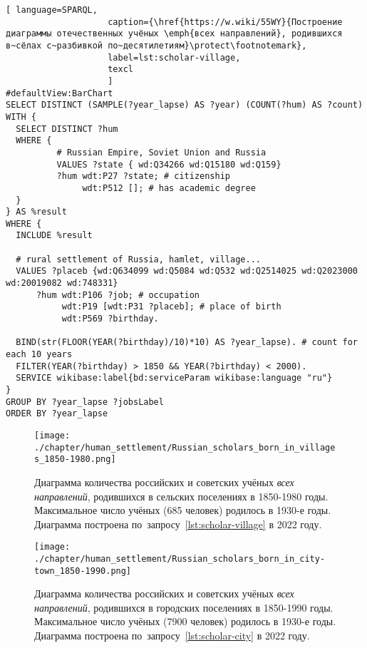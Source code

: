 \begin{fullwidth}
\begin{lstlisting}[ language=SPARQL, 
                    caption={\href{https://w.wiki/55WY}{Построение диаграммы отечественных учёных \emph{всех направлений}, родившихся в~сёлах с~разбивкой по~десятилетиям}\protect\footnotemark},
                    label=lst:scholar-village,
                    texcl 
                    ]
#defaultView:BarChart
SELECT DISTINCT (SAMPLE(?year_lapse) AS ?year) (COUNT(?hum) AS ?count) 
WITH {
  SELECT DISTINCT ?hum 
  WHERE {
          # Russian Empire, Soviet Union and Russia
          VALUES ?state { wd:Q34266 wd:Q15180 wd:Q159}
          ?hum wdt:P27 ?state; # citizenship
               wdt:P512 []; # has academic degree 
  }
} AS %result
WHERE {
  INCLUDE %result

  # rural settlement of Russia, hamlet, village...
  VALUES ?placeb {wd:Q634099 wd:Q5084 wd:Q532 wd:Q2514025 wd:Q2023000 wd:20019082 wd:748331}
      ?hum wdt:P106 ?job; # occupation
           wdt:P19 [wdt:P31 ?placeb]; # place of birth
           wdt:P569 ?birthday.
  
  BIND(str(FLOOR(YEAR(?birthday)/10)*10) AS ?year_lapse). # count for each 10 years
  FILTER(YEAR(?birthday) > 1850 && YEAR(?birthday) < 2000).
  SERVICE wikibase:label{bd:serviceParam wikibase:language "ru"}
}
GROUP BY ?year_lapse ?jobsLabel
ORDER BY ?year_lapse
\end{lstlisting}%
\end{fullwidth}


\begin{figure*}
    \texttt{[image: ./chapter/human\_settlement/Russian\_scholars\_born\_in\_villages\_1850-1980.png]}%
	\label{fig:scholars-village-blue}
    \caption[Диаграмма количества отечественных учёных, родившихся в сёлах, 2022 год.]{Диаграмма количества российских и советских учёных \emph{всех направлений}, родившихся в сельских поселениях в 1850-1980 годы. Максимальное число учёных (685 человек) родилось в 1930-е годы. Диаграмма построена по~запросу~\protect\ref{lst:scholar-village} в 2022 году.}%
\end{figure*} 

\begin{figure*}
    \texttt{[image: ./chapter/human\_settlement/Russian\_scholars\_born\_in\_city-town\_1850-1990.png]}%
	\label{fig:scholars-city-blue}
    \caption[Диаграмма количества отечественных учёных, родившихся в городах, 2022 год.]{Диаграмма количества российских и советских учёных \emph{всех направлений}, родившихся в городских поселениях в 1850-1990 годы. Максимальное число учёных (7900 человек) родилось в 1930-е годы. Диаграмма построена по~запросу~\protect\ref{lst:scholar-city} в 2022 году.}%
\end{figure*} 

